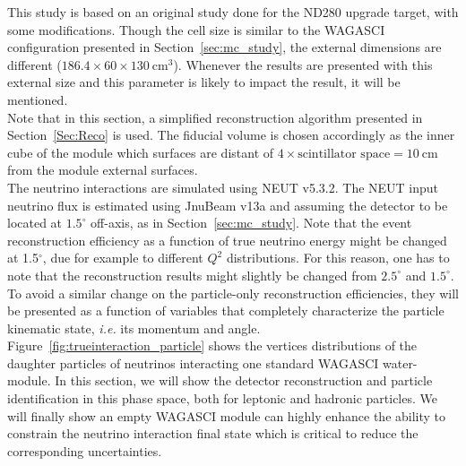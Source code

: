 This study is based on an original study done for the ND280 upgrade target, with some modifications. Though the cell size is similar to the WAGASCI configuration presented in Section~\ref{sec:mc_study}, the external dimensions are different ($186.4 \times 60 \times 130~$cm$^{3}$). Whenever the results are presented with this external size and this parameter is likely to impact the result, it will be mentioned.\\
Note that in this section, a simplified reconstruction algorithm presented in Section~\ref{Sec:Reco} is used. The fiducial volume is chosen accordingly as the inner cube of the module which surfaces are distant of $4 \times \text{scintillator space} = 10~$cm from the module external surfaces.\\
The neutrino interactions are simulated using NEUT v5.3.2. The NEUT input neutrino flux is estimated using JnuBeam v13a and assuming the detector to be located at $1.5^{\circ}$ off-axis, as in Section~\ref{sec:mc_study}. Note that the event reconstruction efficiency as a function of true neutrino energy might be changed at 1.5$^{\circ}$, due for example to different $Q^{2}$ distributions. For this reason, one has to note that the reconstruction results might slightly be changed from $2.5^{\circ}$ and $1.5^{\circ}$. To avoid a similar change on the particle-only reconstruction efficiencies, they will be presented as a function of variables that completely characterize the particle kinematic state, \textit{i.e.} its momentum and angle. Figure~\ref{fig:trueinteraction_particle} shows the vertices distributions of the daughter particles of neutrinos interacting one standard WAGASCI water-module. In this section, we will show the detector reconstruction and particle identification in this phase space, both for leptonic and hadronic particles. We will finally show an empty WAGASCI module can highly enhance the ability to constrain the neutrino interaction final state which is critical to reduce the corresponding uncertainties.

